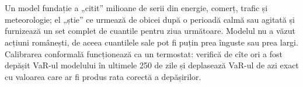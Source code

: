 \section{}
\begin{intuition}
%
{Un model fundație a „citit” milioane de serii din energie, comerț, trafic și meteorologie; el „știe” ce urmează de obicei după o perioadă calmă sau agitată și furnizează un set complet de cuantile pentru ziua următoare.
Modelul nu a văzut acțiuni românești, de aceea cuantilele sale pot fi puțin prea înguste sau prea largi. Calibrarea conformală funcționează ca un termostat: verifică de cîte ori a fost depășit VaR-ul modelului în ultimele 250 de zile și deplasează VaR-ul de azi exact cu valoarea care ar fi produs rata corectă a depășirilor.}
\end{intuition}
